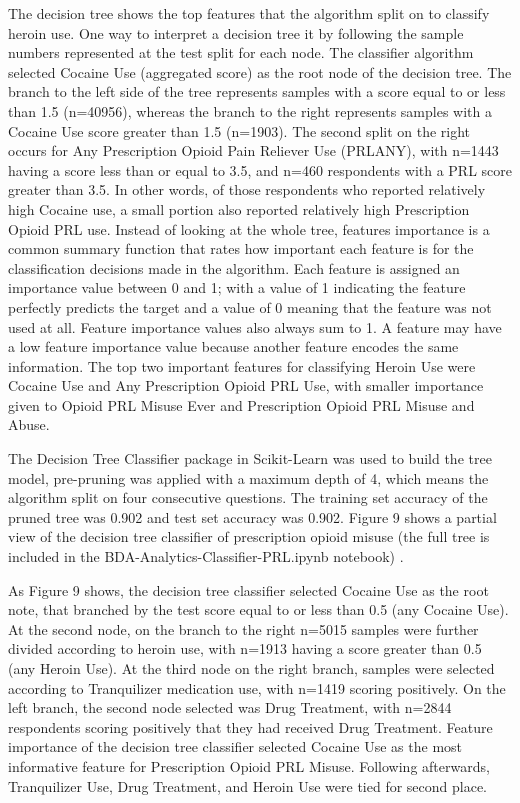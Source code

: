 \documentclass[sigconf]{acmart}
\begin{document}
The decision tree shows the top features that the algorithm 
split on to classify heroin use. One way to interpret a decision tree it by 
following the sample numbers represented at the test split for each node. 
The classifier algorithm selected Cocaine Use (aggregated score) as the root 
node of the decision tree. The branch to the left  side of the tree represents 
samples with a score equal to or less than 1.5 (n=40956), whereas the branch 
to the right represents samples with a Cocaine Use score greater than 1.5
(n=1903). The second split on the right occurs for Any Prescription Opioid 
Pain Reliever Use (PRLANY), with n=1443 having a score less than or equal 
to 3.5, and n=460 respondents with a PRL score greater than 3.5. In other 
words, of those respondents who reported relatively high Cocaine use, a small
portion also reported relatively high Prescription Opioid PRL use. Instead of 
looking at the whole tree, features importance is a common summary function 
that rates how important each feature is for the classification decisions 
made in the algorithm. Each feature is assigned an importance value between 
0 and 1; with a value of 1 indicating the feature perfectly predicts the 
target and a value of 0 meaning that the feature was not used at all. 
Feature importance values also always sum to 1. A feature may have a low 
feature importance value because another feature encodes the same information. 
The top two important features for classifying Heroin Use were Cocaine Use 
and Any Prescription Opioid PRL Use, with smaller importance given to Opioid 
PRL Misuse Ever and Prescription Opioid PRL Misuse and Abuse. 

The Decision Tree Classifier package in Scikit-Learn was used to build the 
tree model, pre-pruning was applied with a maximum depth of 4, which means 
the algorithm split on four consecutive questions. The training set accuracy 
of the pruned tree was 0.902 and test set accuracy was 0.902. Figure 9 shows 
a partial view of the decision tree classifier of prescription opioid misuse
(the full tree is included in the BDA-Analytics-Classifier-PRL.ipynb 
notebook) \cite{classifyPRL}. 

As Figure 9 shows, the decision tree classifier
selected Cocaine Use as the root note, that branched by the test score equal
to or less than 0.5 (any Cocaine Use). At the second node, on the branch to 
the right n=5015 samples were further divided according to heroin use, with 
n=1913 having a score greater than 0.5 (any Heroin Use). At the third node
on the right branch, samples were selected according to Tranquilizer
medication use, with n=1419 scoring positively. On the left branch, the 
second node selected was Drug Treatment, with n=2844 respondents scoring
positively that they had received Drug Treatment. Feature importance of
the decision tree classifier selected Cocaine Use as the most informative
feature for Prescription Opioid PRL Misuse. Following afterwards, 
Tranquilizer Use, Drug Treatment, and Heroin Use were tied for second place. 
\end{document}
